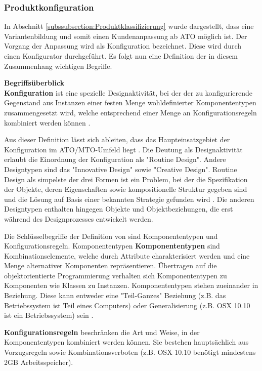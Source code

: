 \documentclass[12pt,a4paper,bibliography=totocnumbered,listof=totoc]{scrartcl}
\begin{document}
\subsubsection{Produktkonfiguration}
 \label{subssubsection:Produktkonfiguration}
 
In Abschnitt \ref{subssubsection:Produktklassifizierung} wurde dargestellt, dass eine Variantenbildung und somit einen Kundenanpassung ab \ac{ATO} möglich ist. Der Vorgang der Anpassung wird als Konfiguration bezeichnet. Diese wird durch einen Konfigurator durchgeführt.  Es folgt nun eine Definition der in diesem Zusammenhang wichtigen Begriffe.

\textbf{Begriffsüberblick}\\
\textbf{Konfiguration} ist eine spezielle Designaktivität, bei der der zu konfigurierende Gegenstand aus Instanzen einer festen Menge wohldefinierter Komponententypen zusammengesetzt wird, welche entsprechend einer Menge an Konfigurationsregeln kombiniert werden können \citep{sabin98}.

Aus dieser Definition lässt sich ableiten, dass das Haupteinsatzgebiet der Konfiguration im \ac{ATO}/\ac{MTO}-Umfeld liegt \citep{lutz11}. Die Deutung als Designaktivität erlaubt die Einordnung der Konfiguration als "Routine Design". Andere Designtypen sind das "Innovative Design" sowie "Creative Design". Routine Design als simpelste der drei Formen ist ein Problem, bei der die Spezifikation der Objekte, deren Eigenschaften sowie kompositionelle Struktur gegeben sind und die Lösung auf Basis einer bekannten Strategie gefunden wird \citep{brown89}. Die anderen Designtypen enthalten hingegen Objekte und Objektbeziehungen, die erst während des Designprozesses entwickelt werden.

Die Schlüsselbegriffe der Definition von \citeauthor{sabin98} sind Komponententypen und Konfigurationsregeln. Komponententypen \textbf{Komponententypen} sind Kombinationselemente, welche durch Attribute charakterisiert werden und eine Menge alternativer Komponenten repräsentieren. Übertragen auf die objektorientierte Programmierung verhalten sich Komponententypen zu Komponenten wie Klassen zu Instanzen. Komponententypen stehen zueinander in Beziehung. Diese kann entweder eine "Teil-Ganzes" Beziehung (z.B. das Betriebssystem ist Teil eines Computers) oder Generalisierung (z.B. OSX 10.10 ist ein Betriebssystem) sein \citep{felferning14}. 

\textbf{Konfigurationsregeln} beschränken die Art und Weise, in der Komponententypen kombiniert werden können. Sie bestehen hauptsächlich aus Vorzugsregeln sowie Kombinationsverboten (z.B. OSX 10.10 benötigt mindestens 2GB Arbeitsspeicher).
\end{document}
